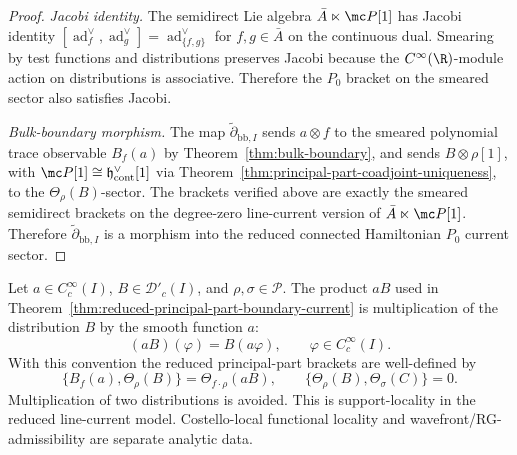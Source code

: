 \documentclass[11pt]{memoir}
\begin{document}
\begin{proof}
  \emph{Jacobi identity.} The semidirect Lie algebra
  $\bar A\ltimes\mc P[1]$ has Jacobi identity
  $[\operatorname{ad}^{\vee}_f,\operatorname{ad}^{\vee}_g]
    =\operatorname{ad}^{\vee}_{\{f,g\}}$ for $f,g\in\bar A$ on the
  continuous dual. Smearing by test functions and distributions
  preserves Jacobi because the $C^\infty(\R)$-module action on
  distributions is associative. Therefore the
  $P_0$ bracket on the smeared sector also satisfies Jacobi.

	  \emph{Bulk-boundary morphism.} The map
	  \(\widetilde\partial_{\mathrm{bb},I}\) sends
	  \(a\otimes f\) to the smeared polynomial trace observable \(B_f(a)\) by
	  Theorem~\ref{thm:bulk-boundary}, and sends
	  \(B\otimes\rho[1]\), with
	  \(\mc P[1]\cong\mathfrak h^\vee_{\mathrm{cont}}[1]\) via
	  Theorem~\ref{thm:principal-part-coadjoint-uniqueness}, to the
		  \(\Theta_\rho(B)\)-sector. The brackets verified above are exactly the
	  smeared semidirect brackets on the degree-zero line-current version of
	  \(\bar A\ltimes\mc P[1]\). Therefore
	  \(\widetilde\partial_{\mathrm{bb},I}\) is a morphism into the reduced
	  connected Hamiltonian \(P_0\) current sector.
\end{proof}

\begin{lem}
  \label{lem:distribution-locality-principal-parts}
  Let \(a\in C^\infty_c(I)\), \(B\in\mathcal D'_c(I)\), and
  \(\rho,\sigma\in\mathcal P\).  The product \(aB\) used in
  Theorem~\ref{thm:reduced-principal-part-boundary-current} is
  multiplication of the distribution \(B\) by the smooth function \(a\):
  \[
    (aB)(\varphi)=B(a\varphi),\qquad \varphi\in C^\infty_c(I).
  \]
  With this convention the reduced principal-part brackets are
  well-defined by
  \[
    \{B_f(a),\Theta_\rho(B)\}=\Theta_{f\cdot\rho}(aB),
    \qquad
    \{\Theta_\rho(B),\Theta_\sigma(C)\}=0 .
  \]
	  Multiplication of two distributions is avoided.
	  This is support-locality in the reduced line-current model. Costello-local
	  functional locality and wavefront/RG-admissibility are separate analytic
	  data.
\end{lem}
\end{document}
